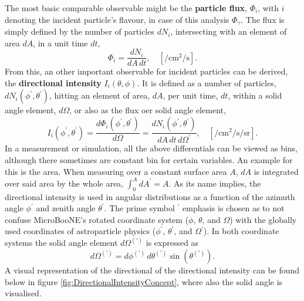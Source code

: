 The most basic comparable observable might be the \textbf{particle flux}, $\Phi_i$, with $i$ denoting the incident particle's flavour, \ie in case of this analysis $\Phi_{\gamma}$. The flux is simply defined  by the number of particles $dN_i$, intersecting with an element of area $dA$, in a unit time $dt$,
\begin{equation} \label{eq:ParticleFlux}
    \Phi_i = \frac{dN_i}{dA \, dt}, \quad \left[ \si{\per\centi\metre\squared\per\second} \right].
\end{equation}
From this, an other important observable for incident particles can be derived, the \textbf{directional intensity} $I_{i}(\theta,\phi)$. It is defined as a number of particles, $dN_i(\phi^{\prime},\theta^{\prime})$, hitting an element of area, $dA$, per unit time, $dt$, within a solid angle element, $d\Omega$, or also as the flux oer solid angle element, \cite{CosmicRayGrieder}
\begin{equation} \label{eq:DirectionalIntensity}
    I_i(\phi^{\prime},\theta^{\prime}) = \frac{d\Phi_i(\phi^{\prime},\theta^{\prime})}{d\Omega} = \frac{dN_i(\phi^{\prime},\theta^{\prime})}{dA \, dt \, d\Omega^{\prime}}, \quad \left[ \si{\per\centi\metre\squared\per\second\per\steradian} \right].
\end{equation}
In a measurement or simulation, all the above differentials can be viewed as bins, although there sometimes are constant bin for certain variables. An example for this is the area. When measuring over a constant surface area $A$, $dA$ is integrated over said area by the whole area, \ie $\int_{0}^{A} dA^{\prime} = A$. As its name implies, the directional intensity is used in angular distributions as a function of the azimuth angle $\phi^{\prime}$ and zenith angle $\theta^{\prime}$. The prime symbol $^{\prime}$ emphasis is chosen as to not confuse MicroBooNE's rotated coordinate system ($\phi$, $\theta$, and $\Omega$) with the globally used coordinates of astroparticle physics ($\phi^{\prime}$, $\theta^{\prime}$, and  $\Omega^{\prime}$). In both coordinate systems the solid angle element $d\Omega^{(\prime)}$ is expressed as
\begin{equation} \label{eq:SolidAngleElement}
    d\Omega^{(\prime)} = d\phi^{(\prime)}\, d\theta^{(\prime)} \sin{(\theta^{(\prime)})}.
\end{equation}
A visual representation of the directional of the directional intensity can be found below in figure \ref{fig:DirectionalIntensityConcept}, where also the solid angle is visualised.
